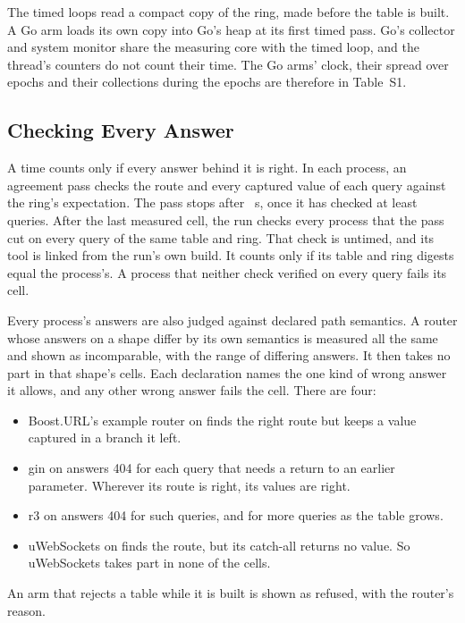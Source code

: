 The timed loops read a compact copy of the ring, made before the table is built. A Go arm loads its
own copy into Go's heap at its first timed pass. Go's collector and system monitor share the
measuring core with the timed loop, and the thread's counters do not count their time. The Go arms'
clock, their spread over epochs and their collections during the epochs are therefore in Table~S1.

\subsection{Checking Every Answer}\label{sec:checks}

A time counts only if every answer behind it is right. In each process, an agreement pass checks the
route and every captured value of each query against the ring's expectation. The pass stops after
\VerifyBudgetSeconds~s, once it has checked at least \VerifyMinQueries{} queries. After the last
measured cell, the run checks every process that the pass cut on every query of the same table and
ring. That check is untimed, and its tool is linked from the run's own build. It counts only if its
table and ring digests equal the process's. A process that neither check verified on every query
fails its cell.

Every process's answers are also judged against declared path semantics. A router whose answers on a
shape differ by its own semantics is measured all the same and shown as incomparable, with the range
of differing answers. It then takes no part in that shape's cells. Each declaration names the one
kind of wrong answer it allows, and any other wrong answer fails the cell. There are four:
\begin{itemize}
\item Boost.URL's example router on  finds the right route but keeps a value
captured in a branch it left.
\item gin on  answers 404 for each query that needs a return to an earlier
parameter. Wherever its route is right, its values are right.
\item r3 on  answers 404 for such queries, and for more queries as the table
grows.
\item uWebSockets on  finds the route, but its catch-all returns no value. So uWebSockets
takes part in none of the  cells.
\end{itemize}
An arm that rejects a table while it is built is shown as refused, with the router's reason.

